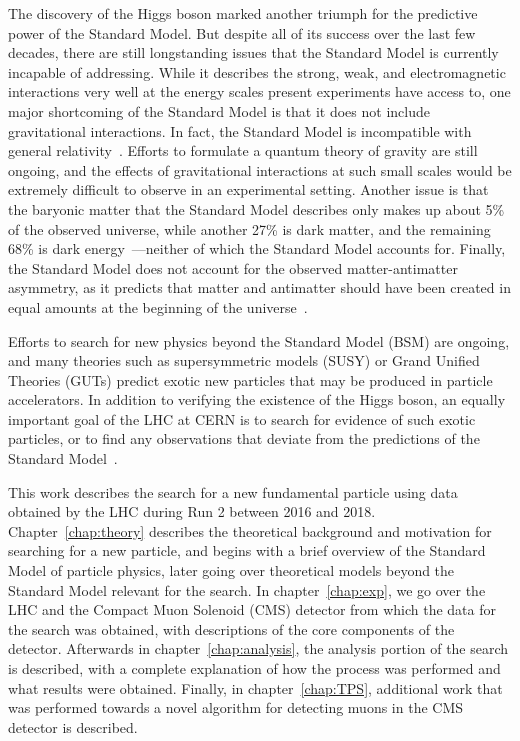 The discovery of the Higgs boson marked another triumph for the predictive power of the Standard Model.
But despite all of its success over the last few decades, there are still longstanding issues that the Standard Model is currently incapable of addressing.
While it describes the strong, weak, and electromagnetic interactions very well at the energy scales present experiments have access to, one major shortcoming of the Standard Model is that it does not include gravitational interactions.
In fact, the Standard Model is incompatible with general relativity~\cite{Macias200899}.
Efforts to formulate a quantum theory of gravity are still ongoing, and the effects of gravitational interactions at such small scales would be extremely difficult to observe in an experimental setting.
Another issue is that the baryonic matter that the Standard Model describes only makes up about 5\% of the observed universe, while another 27\% is dark matter, and the remaining 68\% is dark energy~\cite{Planck2013}---neither of which the Standard Model accounts for.
Finally, the Standard Model does not account for the observed matter-antimatter asymmetry, as it predicts that matter and antimatter should have been created in equal amounts at the beginning of the universe~\cite{astroParticle}.

Efforts to search for new physics beyond the Standard Model (BSM) are ongoing, and many theories such as supersymmetric models (SUSY) or Grand Unified Theories (GUTs) predict exotic new particles that may be produced in particle accelerators.
In addition to verifying the existence of the Higgs boson, an equally important goal of the LHC at CERN is to search for evidence of such exotic particles, or to find any observations that deviate from the predictions of the Standard Model~\cite{doi:10.1080/0010751031000077378,Kanti}.

This work describes the search for a new fundamental particle using data obtained by the LHC during Run 2 between 2016 and 2018.
Chapter~\ref{chap:theory} describes the theoretical background and motivation for searching for a new particle, and begins with a brief overview of the Standard Model of particle physics, later going over theoretical models beyond the Standard Model relevant for the search.
In chapter~\ref{chap:exp}, we go over the LHC and the Compact Muon Solenoid (CMS) detector from which the data for the search was obtained, with descriptions of the core components of the detector.
Afterwards in chapter~\ref{chap:analysis}, the analysis portion of the search is described, with a complete explanation of how the process was performed and what results were obtained.
Finally, in chapter~\ref{chap:TPS}, additional work that was performed towards a novel algorithm for detecting muons in the CMS detector is described.
